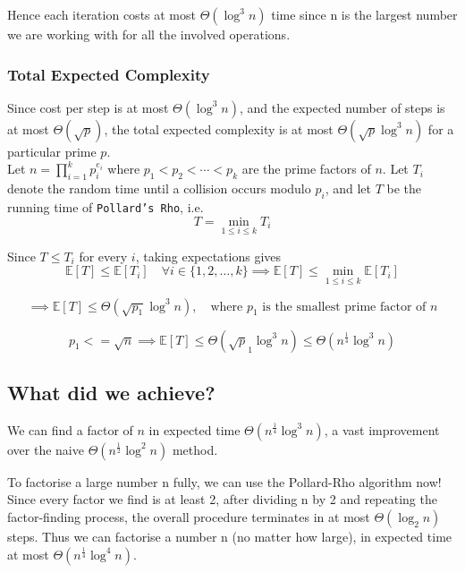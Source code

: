 Hence each iteration costs at most \(\Theta(\log^3 n)\) time since 
n is the largest number we are working with for all the involved operations.

\subsubsection{Total Expected Complexity}

Since cost per step is at most \(\Theta(\log^3 n)\), and the expected number 
of steps is at most \(\Theta(\sqrt p)\), the total expected complexity is 
at most \(\Theta(\sqrt p \log^3 n)\) for a particular prime $p$.\\


\noindent Let \(n=\prod_{i=1}^k p_i^{e_i}\) where \(p_1<p_2<\cdots<p_k\) are the 
prime factors of \(n\). Let \(T_i\) denote 
the random time until a collision occurs modulo \(p_i\), and let \(T\) be the 
running time of \texttt{Pollard's Rho}, i.e.
\[
T=\min_{1\le i\le k} T_i
\]

Since \(T\le T_i\) for every \(i\), taking expectations gives
\[
\mathbb E[T]\le \mathbb E[T_i]\quad \forall i \in \{1,2,\dots,k\}
\implies
\mathbb E[T]\le \min_{1 \le i \le k} \mathbb E[T_i]
\]

\[
\implies
\mathbb E[T]\le \Theta(\sqrt{p_1}\log^3 n), \hspace{1em}\text{where \(p_1\) is the smallest prime factor of }n
\]

\vspace{0.7em}


\[
p_1<=\sqrt n \implies \mathbb E[T]\le \Theta(\sqrt p_1 \log^3 n) \le \Theta(n^{\frac{1}{4}}\log^3 n)
\]

\subsection*{What did we achieve?}

We can find a factor of \(n\) in expected time \(\Theta(n^{\frac{1}{4}}\log^3 n)\), a vast 
improvement over the naive \(\Theta(n^{\frac{1}{2}}\log^2 n)\) method.

To factorise a large number n fully, we can use the Pollard-Rho algorithm now! Since every 
factor we find is at least 2, after dividing n by 2 and repeating the factor-finding process, 
the overall procedure terminates in at most \(\Theta(\log_2 n)\) steps. Thus we can factorise a 
number n (no matter how large), in expected time at most \(\Theta(n^{\frac{1}{4}} \log^4 n)\).\\

